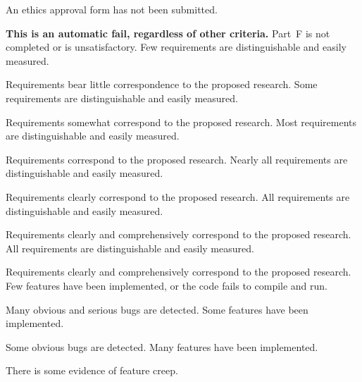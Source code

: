 \documentclass{../fal_assignment}
\begin{document}
\rubricyearthree
{}
\begin{markingrubric}
		\grade\fail An ethics approval form has not been submitted.
			\par \textbf{This is an automatic fail, regardless of other criteria.}
		\grade\fail Part~F is not completed or is unsatisfactory.
        \grade \fail Few requirements are distinguishable and easily measured.
            \par Requirements bear little correspondence to the proposed research.
        \grade Some requirements are distinguishable and easily measured.
            \par Requirements somewhat correspond to the proposed research.
        \grade Most requirements are distinguishable and easily measured.
            \par Requirements correspond to the proposed research.
        \grade Nearly all requirements are distinguishable and easily measured.
            \par Requirements clearly correspond to the proposed research.
        \grade All requirements are distinguishable and easily measured.
            \par Requirements clearly and comprehensively correspond to the proposed research.
        \grade All requirements are distinguishable and easily measured.
            \par Requirements clearly and comprehensively correspond to the proposed research.
%
        \grade \fail Few features have been implemented, or the code fails to compile and run.
            \par Many obvious and serious bugs are detected.
        \grade Some features have been implemented.
            \par Some obvious bugs are detected.
        \grade Many features have been implemented.
            \par There is some evidence of feature creep.

\end{markingrubric}
\end{document}
